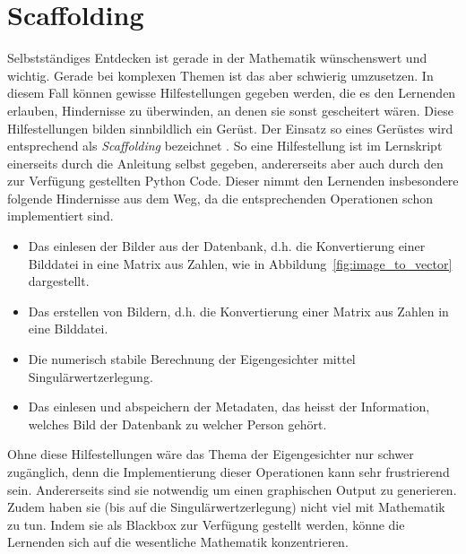 \section{Scaffolding}
Selbstständiges Entdecken ist gerade in der Mathematik wünschenswert und wichtig.
Gerade bei komplexen Themen ist das aber schwierig umzusetzen.
In diesem Fall können gewisse Hilfestellungen gegeben werden, die es den Lernenden erlauben, Hindernisse zu überwinden, an denen sie sonst gescheitert wären.
Diese Hilfestellungen bilden sinnbildlich ein \glqq{}Gerüst\grqq{}.
Der Einsatz so eines Gerüstes wird entsprechend als \textit{Scaffolding} bezeichnet \cite{Schnotz2006}.
So eine Hilfestellung ist im Lernskript einerseits durch die Anleitung selbst gegeben, andererseits aber auch durch den zur Verfügung gestellten Python Code.
Dieser nimmt den Lernenden insbesondere folgende Hindernisse aus dem Weg, da die entsprechenden Operationen schon implementiert sind.
\begin{itemize}
	\item Das einlesen der Bilder aus der Datenbank, d.h. die Konvertierung einer Bilddatei in eine Matrix aus Zahlen, wie in Abbildung~\ref{fig:image_to_vector} dargestellt.
	\item Das erstellen von Bildern, d.h. die Konvertierung einer Matrix aus Zahlen in eine Bilddatei.
	\item Die numerisch stabile Berechnung der Eigengesichter mittel Singulärwertzerlegung.
	\item Das einlesen und abspeichern der Metadaten, das heisst der Information, welches Bild der Datenbank zu welcher Person gehört.
\end{itemize}
Ohne diese Hilfestellungen wäre das Thema der Eigengesichter nur schwer zugänglich, denn die Implementierung dieser Operationen kann sehr frustrierend sein.
Andererseits sind sie notwendig um einen graphischen Output zu generieren. 
Zudem haben sie (bis auf die Singulärwertzerlegung) nicht viel mit Mathematik zu tun.
Indem sie als Blackbox zur Verfügung gestellt werden, könne die Lernenden sich auf die wesentliche Mathematik konzentrieren.